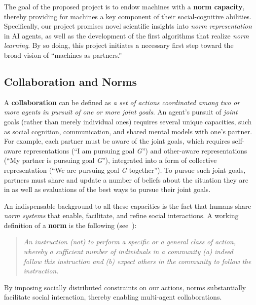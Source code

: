 The goal of the proposed project is to endow machines with a
\textbf{norm capacity}, thereby providing
for machines a key component of their social-cognitive abilities.
Specifically, our project promises novel scientific insights into
\emph{norm representation\/} in AI agents, as well as the development
of the first algorithms that realize \emph{norm learning}.  By so
doing, this project initiates a necessary first step toward the broad
vision of ``machines as partners.''


\subsection{Collaboration and Norms}

\noindent A {\bf collaboration} can be defined as {\em a set of
  actions coordinated among two or more agents in pursuit of one or
  more joint goals}.  An agent's pursuit of {\em joint} goals (rather
than merely individual ones) requires several unique capacities,
such as social cognition, communication, and shared mental models with
one's partner.  For example, each partner must be aware of the joint
goals, which requires self-aware representations (``I am pursuing goal
{\em G}'') and other-aware representations (``My partner is pursuing
goal {\em G}''), integrated into a form of collective representation
(``We are pursuing goal {\em G} together'').  To pursue such joint
goals, partners must share and update a number of beliefs about the
situation they are in as well as evaluations of the best ways to
pursue their joint goals.

An indispensable background to all these capacities is the fact that
humans share {\em norm systems} that enable, facilitate, and refine
social interactions.  A working definition of a
{\bf norm} is the following (see~\cite{bicchieri06}):

\begin{quote}
  {\em An instruction (not) to perform a specific or a general class
    of action, whereby a sufficient number of individuals in a
    community (a) indeed follow this instruction and (b) expect others
    in the community to follow the instruction.}
\end{quote}

\noindent
By imposing socially distributed constraints on our actions, norms
substantially facilitate social interaction, thereby enabling
multi-agent collaborations.

